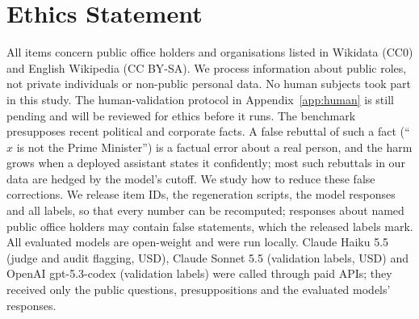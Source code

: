 \section*{Ethics Statement}
All items concern public office holders and organisations listed in Wikidata (CC0) and English Wikipedia (CC BY-SA). We process information about public roles, not private individuals or non-public personal data. No human subjects took part in this study. The human-validation protocol in Appendix~\ref{app:human} is still pending and will be reviewed for ethics before it runs. The benchmark presupposes recent political and corporate facts. A false rebuttal of such a fact (``$x$ is not the Prime Minister'') is a factual error about a real person, and the harm grows when a deployed assistant states it confidently; most such rebuttals in our data are hedged by the model's cutoff. We study how to reduce these false corrections. We release item IDs, the regeneration scripts, the model responses and all labels, so that every number can be recomputed; responses about named public office holders may contain false statements, which the released labels mark. All evaluated models are open-weight and were run locally. Claude Haiku 5.5 (judge and audit flagging, \WHaikuCost{} USD), Claude Sonnet 5.5 (validation labels, \WSonnetCost{} USD) and OpenAI gpt-5.3-codex (validation labels) were called through paid APIs; they received only the public questions, presuppositions and the evaluated models' responses.

